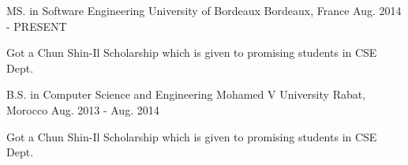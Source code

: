 \begin{cventries}
  \cventry
      {MS. in Software Engineering}
    {University of Bordeaux}
    {Bordeaux, France}
    {Aug. 2014 - PRESENT}
    {
      \begin{cvitems}
        \item {Got a Chun Shin-Il Scholarship which is given to promising students in CSE Dept.}
      \end{cvitems}
    }
    \cventry
    {B.S. in Computer Science and Engineering}
    {Mohamed V University}
    {Rabat, Morocco}
    {Aug. 2013 - Aug. 2014}
    {
      \begin{cvitems}
        \item {Got a Chun Shin-Il Scholarship which is given to promising students in CSE Dept.}
      \end{cvitems}
    }
\end{cventries}
